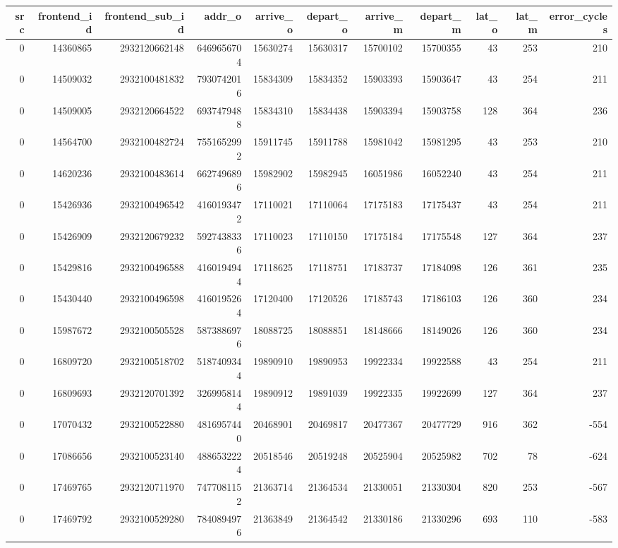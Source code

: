 \begin{tabular}{rrrrrrrrrrr}
\toprule
src & frontend\_id & frontend\_sub\_id & addr\_o & arrive\_o & depart\_o & arrive\_m & depart\_m & lat\_o & lat\_m & error\_cycles \\
\midrule
0 & 14360865 & 2932120662148 & 6469656704 & 15630274 & 15630317 & 15700102 & 15700355 & 43 & 253 & 210 \\
0 & 14509032 & 2932100481832 & 7930742016 & 15834309 & 15834352 & 15903393 & 15903647 & 43 & 254 & 211 \\
0 & 14509005 & 2932120664522 & 6937479488 & 15834310 & 15834438 & 15903394 & 15903758 & 128 & 364 & 236 \\
0 & 14564700 & 2932100482724 & 7551652992 & 15911745 & 15911788 & 15981042 & 15981295 & 43 & 253 & 210 \\
0 & 14620236 & 2932100483614 & 6627496896 & 15982902 & 15982945 & 16051986 & 16052240 & 43 & 254 & 211 \\
0 & 15426936 & 2932100496542 & 4160193472 & 17110021 & 17110064 & 17175183 & 17175437 & 43 & 254 & 211 \\
0 & 15426909 & 2932120679232 & 5927438336 & 17110023 & 17110150 & 17175184 & 17175548 & 127 & 364 & 237 \\
0 & 15429816 & 2932100496588 & 4160194944 & 17118625 & 17118751 & 17183737 & 17184098 & 126 & 361 & 235 \\
0 & 15430440 & 2932100496598 & 4160195264 & 17120400 & 17120526 & 17185743 & 17186103 & 126 & 360 & 234 \\
0 & 15987672 & 2932100505528 & 5873886976 & 18088725 & 18088851 & 18148666 & 18149026 & 126 & 360 & 234 \\
0 & 16809720 & 2932100518702 & 5187409344 & 19890910 & 19890953 & 19922334 & 19922588 & 43 & 254 & 211 \\
0 & 16809693 & 2932120701392 & 3269958144 & 19890912 & 19891039 & 19922335 & 19922699 & 127 & 364 & 237 \\
0 & 17070432 & 2932100522880 & 4816957440 & 20468901 & 20469817 & 20477367 & 20477729 & 916 & 362 & -554 \\
0 & 17086656 & 2932100523140 & 4886532224 & 20518546 & 20519248 & 20525904 & 20525982 & 702 & 78 & -624 \\
0 & 17469765 & 2932120711970 & 7477081152 & 21363714 & 21364534 & 21330051 & 21330304 & 820 & 253 & -567 \\
0 & 17469792 & 2932100529280 & 7840894976 & 21363849 & 21364542 & 21330186 & 21330296 & 693 & 110 & -583 \\

\end{tabular}
